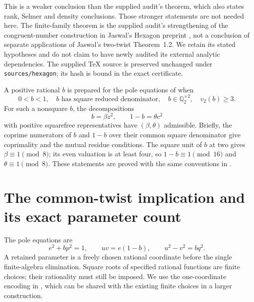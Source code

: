 \documentclass[11pt,a4paper]{article}
\theoremstyle{definition}\newtheorem{definition}[theorem]{Definition}
\theoremstyle{remark}\newtheorem{remark}[theorem]{Remark}
\newcommand{\Q}{\mathbb Q}\newcommand{\Z}{\mathbb Z}
\begin{document}
This is a weaker conclusion than the supplied audit's theorem, which also
states rank, Selmer and density conclusions. Those stronger statements
are not needed here. The finite-family theorem is the supplied audit's
strengthening of the congruent-number construction in Jaswal's Hexagon
preprint \cite{Jaswal}, not a conclusion of separate applications of
Jaswal's two-twist Theorem~1.2. We retain its stated hypotheses and do not
claim to have newly audited its external analytic dependencies. The supplied
TeX source is preserved unchanged under
\nolinkurl{sources/hexagon}; its hash is bound in the exact certificate.

A positive rational $b$ is prepared for the pole equations of
\cite{Congruent} when
\[
 0<b<1,\quad b\text{ has square reduced denominator},\quad
 b\in\Q_2^{\times2},\quad v_2(b)\ge3.
\]
For such a nonsquare $b$, the decompositions
\[
                       b=\beta z^2,\qquad 1-b=\theta c^2
\]
with positive squarefree representatives have $(\beta,\theta)$
admissible. Briefly, the coprime numerators of $b$ and $1-b$ over their
common square denominator give coprimality and the mutual residue
conditions. The square unit of $b$ at two gives $\beta\equiv1\pmod8$;
its even valuation is at least four, so $1-b\equiv1\pmod{16}$ and
$\theta\equiv1\pmod8$. These statements are proved with the same
conventions in \cite{Congruent}.

\section{The common-twist implication and its exact parameter count}
The pole equations are
\begin{equation}\label{eq:pole}
 e^2+bp^2=1,\qquad uv=e(1-b),\qquad u^2-v^2=bq^2.
\end{equation}
A retained parameter is a freely chosen rational coordinate before the
single finite-algebra elimination. Square roots of specified rational
functions are finite choices; their rationality must still be imposed.
We use the one-coordinate encoding in \cite{Joint}, which can be shared
with the existing finite choices in a larger construction.
\end{document}
